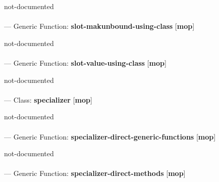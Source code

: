 \begin{adjustwidth}{5em}{5em}
not-documented
\end{adjustwidth}

\paragraph{}
\label{MOP:SLOT-MAKUNBOUND-USING-CLASS}
--- Generic Function: \textbf{slot-makunbound-using-class} [\textbf{mop}] \textit{}

\begin{adjustwidth}{5em}{5em}
not-documented
\end{adjustwidth}

\paragraph{}
\label{MOP:SLOT-VALUE-USING-CLASS}
--- Generic Function: \textbf{slot-value-using-class} [\textbf{mop}] \textit{}

\begin{adjustwidth}{5em}{5em}
not-documented
\end{adjustwidth}

\paragraph{}
\label{MOP:SPECIALIZER}
--- Class: \textbf{specializer} [\textbf{mop}] \textit{}

\begin{adjustwidth}{5em}{5em}
not-documented
\end{adjustwidth}

\paragraph{}
\label{MOP:SPECIALIZER-DIRECT-GENERIC-FUNCTIONS}
--- Generic Function: \textbf{specializer-direct-generic-functions} [\textbf{mop}] \textit{}

\begin{adjustwidth}{5em}{5em}
not-documented
\end{adjustwidth}

\paragraph{}
\label{MOP:SPECIALIZER-DIRECT-METHODS}
--- Generic Function: \textbf{specializer-direct-methods} [\textbf{mop}] \textit{}

